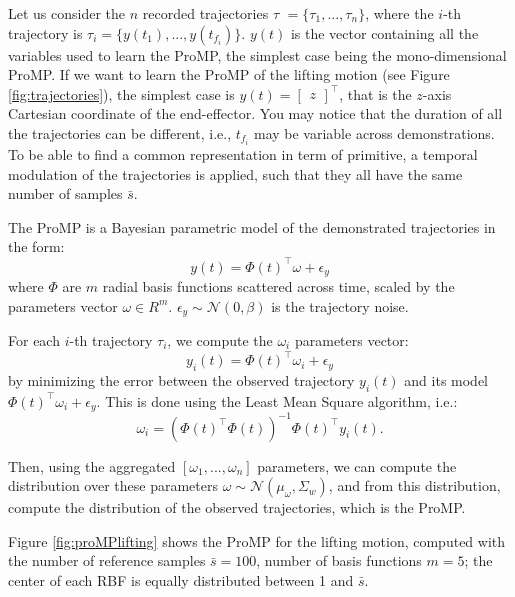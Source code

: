 Let us consider the $n$ recorded trajectories \textcircled{$ \tau$} $= \{\tau_1,..., \tau_n \}$, where  the $i$-th trajectory is $\tau_i = \{y(t_1), ..., y(t_{f_i})\}$. 
$y(t)$ is the vector containing all the variables used to learn the ProMP, the simplest case being the mono-dimensional ProMP. If we want to learn the ProMP of the lifting motion (see Figure \ref{fig:trajectories}), the simplest case is $y(t) =\begin{bmatrix} z\end{bmatrix}^{\top}$, that is the $z$-axis Cartesian coordinate of the end-effector. You may notice that the duration of all the trajectories can be different, i.e.,  $t_{f_i}$ may be variable across demonstrations. 
To be able to find a common representation in term of primitive, a temporal modulation of the trajectories is applied, such that they all have the same number of samples $\bar{s}$. 

The ProMP is a Bayesian parametric model of the demonstrated trajectories in the form: 
$$y(t) = \Phi(t)^\top \omega + \epsilon_y$$ 
where $\Phi$ are $m$ radial basis functions scattered across time, scaled by the parameters vector $\omega \in R^m$. 
$\epsilon_y \sim \mathcal{N}(0, \beta) $ is the trajectory noise. 

For each $i$-th trajectory $\tau_i$, we compute the $\omega_i$ parameters vector:
$$y_i(t) = \Phi(t)^\top \omega_i + \epsilon_y$$ 
by minimizing the error between the observed trajectory $y_i(t)$ and its model $\Phi(t)^\top \omega_i + \epsilon_y$. This is done using the Least Mean Square algorithm, i.e.:
$$ \omega_i = (\Phi(t)^\top\Phi(t))^{-1}\Phi(t)^\top y_i(t).$$

Then, using the aggregated $[\omega_1,..., \omega_n]$ parameters, we can compute the distribution over these parameters $\omega \sim \mathcal{N}(\mu_\omega, \Sigma_w)$, and from this distribution, compute the distribution of the observed trajectories, which is the ProMP.

Figure \ref{fig:proMPlifting} shows the ProMP for the lifting motion, computed with the number of reference samples $\bar{s}=100$, number of basis functions $m=5$; the center of each RBF is equally distributed between 1 and $\bar{s}$.


